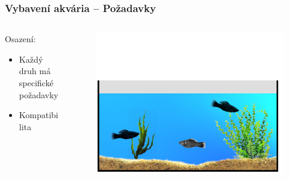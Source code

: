 \documentclass[%
  12pt,       				%
	t,                  %
	aspectratio=1610,   %
	unicode,						%
]{beamer}				    	%
\begin{document}
\begin{frame} 
	\frametitle{Vybavení akvária -- Požadavky}
	
	\begin{columns}[T] 								%
		\begin{column}{0.4\textwidth}		%
			Osazení:\\[2ex]
			\begin{itemize}
				\item Každý druh má specifické požadavky
				\item Kompatibilita
			\end{itemize}
		\end{column}
		\begin{column}{0.6\textwidth}		%
			\begin{figure}%
				\centering
				\includegraphics[width=\columnwidth]{obrazky/prezentace/vybaveni-akvaria/02-ryby-kytky}
			\end{figure}
		\end{column}
	\end{columns}											%
\end{frame}
\end{document}
